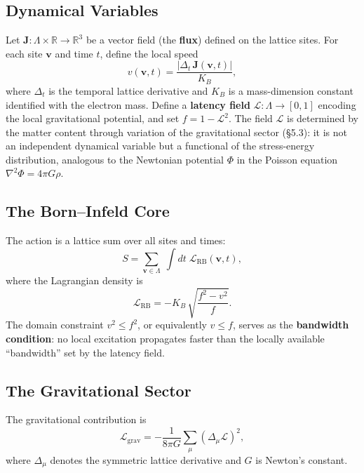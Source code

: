 \documentclass[12pt,a4paper]{article}
\begin{document}
\subsection{Dynamical Variables}

Let $\mathbf{J}: \Lambda \times \mathbb{R} \to \mathbb{R}^{3}$ be a vector field (the \textbf{flux}) defined on the lattice sites. For each site $\mathbf{v}$ and time $t$, define the local speed
\begin{equation}\label{eq:speed}
v(\mathbf{v}, t) = \frac{|\Delta_{t}\,\mathbf{J}(\mathbf{v}, t)|}{K_{B}},
\end{equation}
where $\Delta_{t}$ is the temporal lattice derivative and $K_{B}$ is a mass-dimension constant identified with the electron mass. Define a \textbf{latency field} $\mathcal{L}: \Lambda \to [0, 1]$ encoding the local gravitational potential, and set $f = 1 - \mathcal{L}^{2}$. The field $\mathcal{L}$ is determined by the matter content through variation of the gravitational sector (\S5.3): it is not an independent dynamical variable but a functional of the stress-energy distribution, analogous to the Newtonian potential $\Phi$ in the Poisson equation $\nabla^{2}\Phi = 4\pi G\rho$.

\subsection{The Born--Infeld Core}

The action is a lattice sum over all sites and times:
\begin{equation}\label{eq:action}
S = \sum_{\mathbf{v} \in \Lambda}\;\int dt\;\mathcal{L}_{\mathrm{RB}}(\mathbf{v}, t),
\end{equation}
where the Lagrangian density is
\begin{equation}\label{eq:lagrangian}
\mathcal{L}_{\mathrm{RB}} = -K_{B}\,\sqrt{\frac{f^{2} - v^{2}}{f}}.
\end{equation}
The domain constraint $v^{2} \leq f^{2}$, or equivalently $v \leq f$, serves as the \textbf{bandwidth condition}: no local excitation propagates faster than the locally available ``bandwidth'' set by the latency field.

\subsection{The Gravitational Sector}

The gravitational contribution is
\begin{equation}\label{eq:grav}
\mathcal{L}_{\mathrm{grav}} = -\frac{1}{8\pi G}\sum_{\mu}\left(\Delta_{\mu}\mathcal{L}\right)^{2},
\end{equation}
where $\Delta_{\mu}$ denotes the symmetric lattice derivative and $G$ is Newton's constant.
\end{document}
